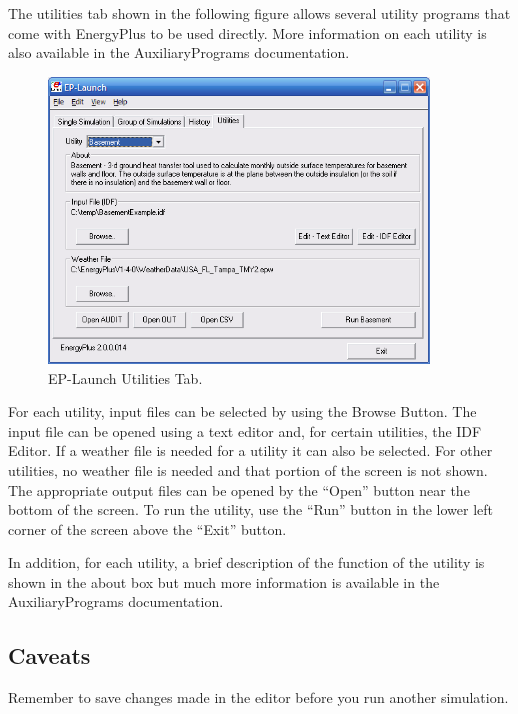 The utilities tab shown in the following figure allows several utility programs that come with EnergyPlus to be used directly. More information on each utility is also available in the AuxiliaryPrograms documentation.

\begin{figure}[hbtp] %
\centering
\includegraphics[width=0.9\textwidth, height=0.9\textheight, keepaspectratio=true]{media/image113.png}
\caption{EP-Launch Utilities Tab. \protect \label{fig:ep-launch-utilities-tab.}}
\end{figure}

For each utility, input files can be selected by using the Browse Button. The input file can be opened using a text editor and, for certain utilities, the IDF Editor. If a weather file is needed for a utility it can also be selected. For other utilities, no weather file is needed and that portion of the screen is not shown. The appropriate output files can be opened by the ``Open'' button near the bottom of the screen. To run the utility, use the ``Run'' button in the lower left corner of the screen above the ``Exit'' button.

In addition, for each utility, a brief description of the function of the utility is shown in the about box but much more information is available in the AuxiliaryPrograms documentation.

\subsection{Caveats}\label{caveats}

Remember to save changes made in the editor before you run another simulation.

